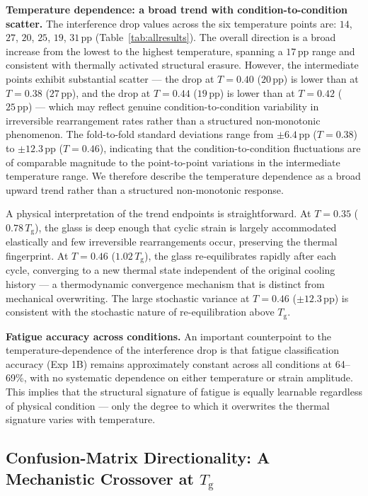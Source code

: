 \documentclass[12pt,a4paper]{article}
\newcommand{\Tg}{T_{\mathrm{g}}}
\newcommand{\degpp}{\,\text{pp}}
\begin{document}
\textbf{Temperature dependence: a broad trend with condition-to-condition scatter.}
The interference drop values across the six temperature points are: $14$, $27$, $20$, $25$, $19$, $31\degpp$ (Table~\ref{tab:allresults}).
The overall direction is a broad increase from the lowest to the highest temperature, spanning a $17\degpp$ range and consistent with thermally activated structural erasure.
However, the intermediate points exhibit substantial scatter — the drop at $T = 0.40$ ($20\degpp$) is lower than at $T = 0.38$ ($27\degpp$), and the drop at $T = 0.44$ ($19\degpp$) is lower than at $T = 0.42$ ($25\degpp$) — which may reflect genuine condition-to-condition variability in irreversible rearrangement rates rather than a structured non-monotonic phenomenon.
The fold-to-fold standard deviations range from $\pm 6.4\degpp$ ($T = 0.38$) to $\pm 12.3\degpp$ ($T = 0.46$), indicating that the condition-to-condition fluctuations are of comparable magnitude to the point-to-point variations in the intermediate temperature range.
We therefore describe the temperature dependence as a broad upward trend rather than a structured non-monotonic response.

A physical interpretation of the trend endpoints is straightforward.
At $T = 0.35$ ($0.78\,\Tg$), the glass is deep enough that cyclic strain is largely accommodated elastically and few irreversible rearrangements occur, preserving the thermal fingerprint.
At $T = 0.46$ ($1.02\,\Tg$), the glass re-equilibrates rapidly after each cycle, converging to a new thermal state independent of the original cooling history — a thermodynamic convergence mechanism that is distinct from mechanical overwriting.
The large stochastic variance at $T = 0.46$ ($\pm 12.3\degpp$) is consistent with the stochastic nature of re-equilibration above $\Tg$.

\textbf{Fatigue accuracy across conditions.}
An important counterpoint to the temperature-dependence of the interference drop is that fatigue classification accuracy (Exp 1B) remains approximately constant across all conditions at 64--69\%, with no systematic dependence on either temperature or strain amplitude.
This implies that the structural signature of fatigue is equally learnable regardless of physical condition — only the degree to which it overwrites the thermal signature varies with temperature.

 
\subsection{Confusion-Matrix Directionality: A Mechanistic Crossover at \texorpdfstring{$\Tg$}{Tg}}
\label{sec:asymmetry}
 
\end{document}
